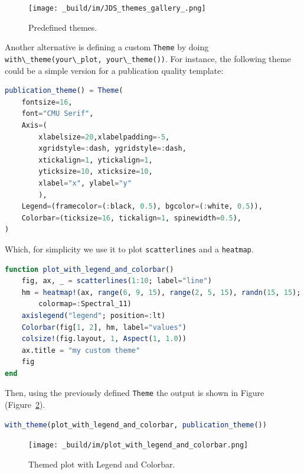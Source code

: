 \documentclass[
  notoc %
]{tufte-book}
\newcommand{\passthrough}[1]{#1}
\begin{document}
\begin{figure}
\hypertarget{fig:makie_themes}{%
\centering
\texttt{[image: \_build/im/JDS\_themes\_gallery\_.png]}
\caption{Predefined themes.}\label{fig:makie_themes}
}
\end{figure}

Another alternative is defining a custom \passthrough{\lstinline!Theme!}
by doing
\passthrough{\lstinline!with\_theme(your\_plot, your\_theme())!}. For
instance, the following theme could be a simple version for a
publication quality template:

\begin{lstlisting}[language=Julia]
publication_theme() = Theme(
    fontsize=16,
    font="CMU Serif",
    Axis=(
        xlabelsize=20,xlabelpadding=-5,
        xgridstyle=:dash, ygridstyle=:dash,
        xtickalign=1, ytickalign=1,
        yticksize=10, xticksize=10,
        xlabel="x", ylabel="y"
        ),
    Legend=(framecolor=(:black, 0.5), bgcolor=(:white, 0.5)),
    Colorbar=(ticksize=16, tickalign=1, spinewidth=0.5),
)
\end{lstlisting}

Which, for simplicity we use it to plot
\passthrough{\lstinline!scatterlines!} and a
\passthrough{\lstinline!heatmap!}.

\begin{lstlisting}[language=Julia]
function plot_with_legend_and_colorbar()
    fig, ax, _ = scatterlines(1:10; label="line")
    hm = heatmap!(ax, range(6, 9, 15), range(2, 5, 15), randn(15, 15);
        colormap=:Spectral_11)
    axislegend("legend"; position=:lt)
    Colorbar(fig[1, 2], hm, label="values")
    colsize!(fig.layout, 1, Aspect(1, 1.0))
    ax.title = "my custom theme"
    fig
end
\end{lstlisting}

Then, using the previously defined \passthrough{\lstinline!Theme!} the
output is shown in Figure
(Figure~\ref{fig:plot_with_legend_and_colorbar}).

\begin{lstlisting}[language=Julia]
with_theme(plot_with_legend_and_colorbar, publication_theme())
\end{lstlisting}

\begin{figure}
\hypertarget{fig:plot_with_legend_and_colorbar}{%
\centering
\texttt{[image: \_build/im/plot\_with\_legend\_and\_colorbar.png]}
\caption{Themed plot with Legend and
Colorbar.}\label{fig:plot_with_legend_and_colorbar}
}
\end{figure}
\end{document}
